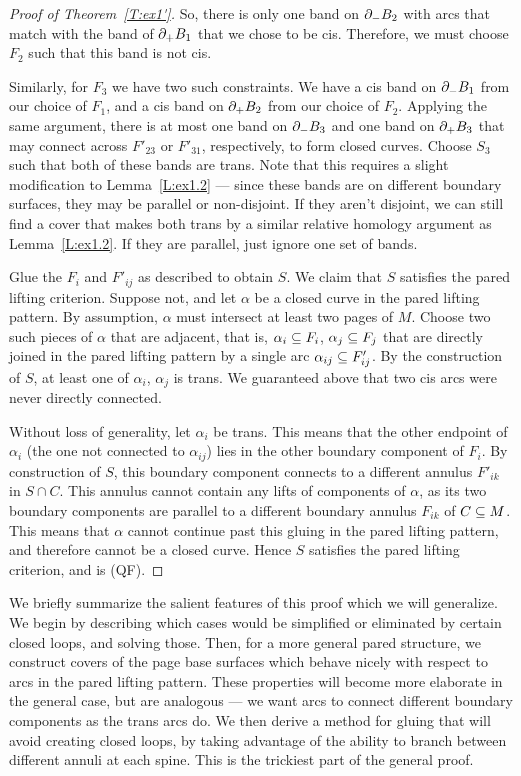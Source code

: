 \begin{proof}[Proof of Theorem~\ref{T:ex1'}]
So, there is only one band on $\partial_-B_2$ with arcs that match with the band of
$\partial_+B_1$ that we chose to be cis. Therefore, we must choose $F_2$ such that
this band is not cis.

Similarly, for $F_3$ we have two such constraints.  We have a cis band on
$\partial_-B_1$ from our choice of $F_1$, and a cis band on $\partial_+B_2$ from our
choice of $F_2$.  Applying the same argument, there is at most one band on
$\partial_-B_3$ and one band on $\partial_+B_3$ that may connect across $F'_{23}$ or
$F'_{31}$, respectively, to form closed curves.  Choose $S_3$ such that both of
these bands are trans. Note that this requires a slight modification to
Lemma~\ref{L:ex1.2} --- since these bands are on different boundary surfaces,
they may be parallel or non-disjoint.  If they aren't disjoint, we can still
find a cover that makes both trans by a similar relative homology argument as
Lemma~\ref{L:ex1.2}. If they are parallel, just ignore one set of bands.

Glue the $F_i$ and $F'_{ij}$ as described to obtain $S$. We claim that $S$
satisfies the pared lifting criterion. Suppose not, and let $\alpha$ be
a closed curve in the pared lifting pattern.  By assumption, $\alpha$ must
intersect at least two pages of $M$. Choose two such pieces of $\alpha$ that
are adjacent, that is, $\alpha_i\subseteq F_i$, $\alpha_j \subseteq F_j$ that are
directly joined in the pared lifting pattern by a single arc $\alpha_{ij} \subseteq
F'_{ij}$.  By the construction of $S$, at least one of $\alpha_i$, $\alpha_j$
is trans. We guaranteed above that two cis arcs were never directly connected.

Without loss of generality, let $\alpha_i$ be trans. This means that the other
endpoint of $\alpha_i$ (the one not connected to $\alpha_{ij}$) lies in the
other boundary component of $F_i$. By construction of $S$, this boundary
component connects to a different annulus $F'_{ik}$ in $S\cap C$. This annulus
cannot contain any lifts of components of $\alpha$, as its two boundary
components are parallel to a different boundary annulus $F_{ik}$ of $C\subseteq M$.
This means that $\alpha$ cannot continue past this gluing in the pared lifting
pattern, and therefore cannot be a closed curve. Hence $S$ satisfies the pared
lifting criterion, and is (QF).

\end{proof}

We briefly summarize the salient features of this proof which we will
generalize.  We begin by describing which cases would be simplified or
eliminated by certain closed loops, and solving those. Then, for a more general
pared structure, we construct covers of the page base surfaces which behave
nicely with respect to arcs in the pared lifting pattern.  These properties
will become more elaborate in the general case, but are analogous --- we want
arcs to connect different boundary components as the trans arcs do.  We then
derive a method for gluing that will avoid creating closed loops, by taking
advantage of the ability to branch between different annuli at each spine. This
is the trickiest part of the general proof.
